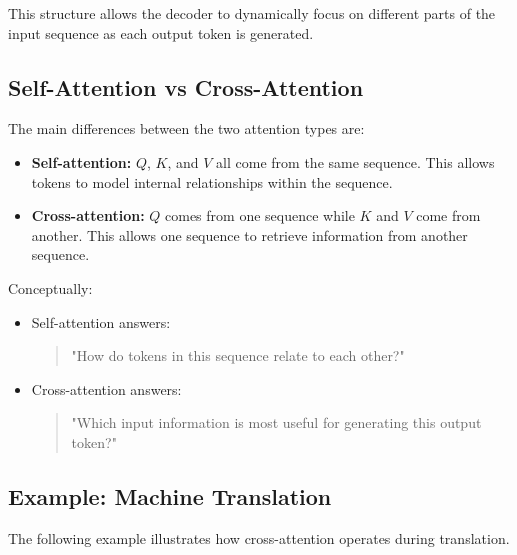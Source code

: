 \documentclass[11pt]{article}
\begin{document}
This structure allows the decoder to dynamically focus on different parts of the input sequence as each output token is generated.

\subsection{Self-Attention vs Cross-Attention}

The main differences between the two attention types are:

\begin{itemize}

\item \textbf{Self-attention:}  
$Q$, $K$, and $V$ all come from the same sequence. This allows tokens to model internal relationships within the sequence.

\item \textbf{Cross-attention:}  
$Q$ comes from one sequence while $K$ and $V$ come from another. This allows one sequence to retrieve information from another sequence.

\end{itemize}

Conceptually:

\begin{itemize}

\item Self-attention answers:
\begin{quote}
"How do tokens in this sequence relate to each other?"
\end{quote}

\item Cross-attention answers:
\begin{quote}
"Which input information is most useful for generating this output token?"
\end{quote}

\end{itemize}

\subsection{Example: Machine Translation}

The following example illustrates how cross-attention operates during translation.
\end{document}

